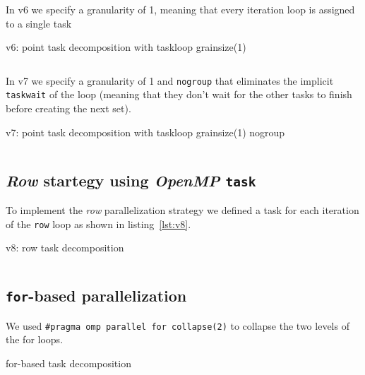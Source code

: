 In v6 we specify a granularity of 1, meaning that every iteration loop is assigned to a single task

\begin{listing}[H]
    \centering
    \caption{v6: point task decomposition with taskloop grainsize(1)}
    \inputminted[firstline=91,lastline=98]{c}{sources/mandel-omp-v6.c}
    \label{lst:v6} 
\end{listing}

In v7 we specify a granularity of 1 and \texttt{nogroup} that eliminates the implicit \texttt{taskwait}
of the loop (meaning that they don't wait for the other tasks to finish before creating the next set).

\begin{listing}[H]
    \centering
    \caption{v7: point task decomposition with taskloop grainsize(1) nogroup}
    \inputminted[firstline=91,lastline=98]{c}{sources/mandel-omp-v7.c}
    \label{lst:v7} 
\end{listing}

\subsection{\emph{Row} startegy using \emph{OpenMP} \texttt{task}}%

To implement the \emph{row} parallelization strategy we defined a task for each iteration of
the \texttt{row} loop as shown in listing~\ref{lst:v8}.

\begin{listing}[H]
    \centering
    \caption{v8: row task decomposition}
    \inputminted[firstline=91,lastline=98]{c}{sources/mandel-omp-v8.c}
    \label{lst:v8} 
\end{listing}

\subsection{\texttt{for}-based parallelization}%

We used \texttt{\#pragma omp parallel for collapse(2)} to collapse the two levels of the for loops.

\begin{listing}[H]
    \centering
    \caption{for-based task decomposition}
    \inputminted[firstline=91,lastline=96]{c}{sources/mandel-omp-v11.c}
    \label{lst:v11} 
\end{listing}


